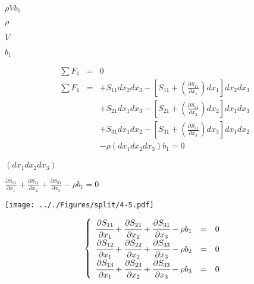 \documentclass[onecolumn,11pt]{report}
\def\lthtmlcheckvsize{\ifdim\ht\sizebox<\vsize 
  \ifdim\wd\sizebox<\hsize\expandafter\hfill\fi \expandafter\vfill
  \else\expandafter\vss\fi}%
\begin{document}
{\newpage\clearpage
{}%
$ \rho V b_1$%
\lthtmlindisplaymathZ
\lthtmlcheckvsize\clearpage}

{\newpage\clearpage
{}%
$ \rho$%
\lthtmlindisplaymathZ
\lthtmlcheckvsize\clearpage}

{\newpage\clearpage
{}%
$ V$%
\lthtmlindisplaymathZ
\lthtmlcheckvsize\clearpage}

{\newpage\clearpage
{}%
$ b_1$%
\lthtmlindisplaymathZ
\lthtmlcheckvsize\clearpage}

{\newpage\clearpage
{}%
\begin{displaymath}\begin{array}{rcl}
\sum F_1 & = & 0 \\
\sum F_1 & =
& + S_{11} dx_2 dx_3 - \left[ S_{11} + (\frac{\partial S_{11}}{\partial x_1}) dx_1 \right] dx_2 dx_3 \\
& & + S_{21} dx_1 dx_3 - \left[ S_{21} + (\frac{\partial S_{21}}{\partial x_2}) dx_2 \right] dx_1 dx_3 \\
& & + S_{31} dx_1 dx_2 - \left[ S_{31} + (\frac{\partial S_{31}}{\partial x_3}) dx_3 \right] dx_1 dx_2 \\
& & - \rho (dx_1 dx_2 dx_3) b_1 = 0
\end{array}\end{displaymath}%
\lthtmldisplayZ
\lthtmlcheckvsize\clearpage}

{\newpage\clearpage
{}%
$ (dx_1 dx_2 dx_3)$%
\lthtmlindisplaymathZ
\lthtmlcheckvsize\clearpage}

{\newpage\clearpage
{}%
$\displaystyle \frac{\partial S_{11}}{\partial x_1} +
\frac{\partial S_{21}}{\partial x_2} +
\frac{\partial S_{31}}{\partial x_3} -
\rho b_1 = 0$%
\lthtmlindisplaymathZ
\lthtmlcheckvsize\clearpage}

{\newpage\clearpage
{}%
\texttt{[image: .././Figures/split/4-5.pdf]}%
\lthtmlpictureZ
\lthtmlcheckvsize\clearpage}

{\newpage\clearpage
{}%
\begin{displaymath}\displaystyle
\left\lbrace
\begin{array}{rcl}
\cfrac{\partial S_{11}}{\partial x_1} +
\cfrac{\partial S_{21}}{\partial x_2} +
\cfrac{\partial S_{31}}{\partial x_3} -
\rho b_1 & = & 0 \\
\cfrac{\partial S_{12}}{\partial x_1} +
\cfrac{\partial S_{22}}{\partial x_2} +
\cfrac{\partial S_{33}}{\partial x_3} -
\rho b_2 & = & 0 \\
\cfrac{\partial S_{13}}{\partial x_1} +
\cfrac{\partial S_{23}}{\partial x_2} +
\cfrac{\partial S_{33}}{\partial x_3} -
\rho b_3 & = & 0 \\
\end{array}
\right.\end{displaymath}%
\lthtmldisplayZ
\lthtmlcheckvsize\clearpage}
\end{document}

